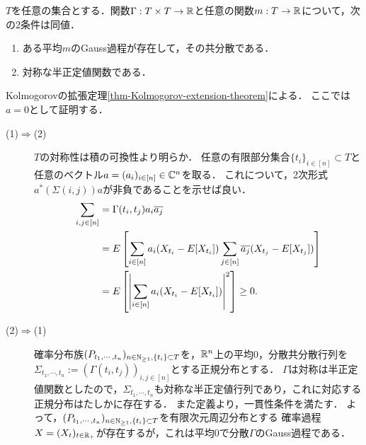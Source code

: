\documentclass[uplatex,dvipdfmx]{jsreport}
\begin{document}
\begin{proposition}[Gauss過程の共分散の特徴付け]\label{prop-existence-of-Gaussian-process}
    $T$を任意の集合とする．関数$\Gamma:T\times T\to\mathbb{R}$と任意の関数$m:T\to\mathbb{R}$について，次の2条件は同値．
    \begin{enumerate}
        \item ある平均$m$のGauss過程が存在して，その共分散である．
        \item 対称な半正定値関数である．
    \end{enumerate}
\end{proposition}
\begin{Proof}
    Kolmogorovの拡張定理\ref{thm-Kolmogorov-extension-theorem}による．
    ここでは$a=0$として証明する．
    \begin{description}
        \item[(1)$\Rightarrow$(2)] $T$の対称性は積の可換性より明らか．
        任意の有限部分集合$\{t_i\}_{i\in[n]}\subset T$と任意のベクトル$a=(a_i)_{i\in[n]}\in\mathbb{C}^n$を取る．
        これについて，2次形式$a^*(\Sigma(i,j))a$が非負であることを示せば良い．
        \begin{align*}
            \sum_{i,j\in[n]}&=\Gamma(t_i,t_j)a_i\overline{a_j}\\
            &=E\left[\sum_{i\in[n]}a_i(X_{t_i}-E[X_{t_i}])\sum_{j\in[n]}\overline{a_j}(X_{t_j}-E[X_{t_j}])\right]\\
            &=E\left[\left|\sum_{i\in[n]}a_i(X_{t_i}-E[X_{t_i}])\right|^2\right]\ge0.
        \end{align*}
        \item[(2)$\Rightarrow$(1)] 
        確率分布族$(P_{t_1,\cdots,t_n})_{n\in\mathbb{N}_{\ge1},\{t_i\}\subset T}$を，$\mathbb{R}^n$上の平均$0$，分散共分散行列を$\Sigma_{t_1,\cdots,t_n}:=(\Gamma(t_i,t_j))_{i,j\in[n]}$とする正規分布とする．
        $\Gamma$は対称は半正定値関数としたので，$\Sigma_{t_1,\cdots,t_n}$も対称な半正定値行列であり，これに対応する正規分布はたしかに存在する．
        また定義より，一貫性条件を満たす．
        よって，$(P_{t_1,\cdots,t_n})_{n\in\mathbb{N}_{\ge1},\{t_i\}\subset T}$を有限次元周辺分布とする
        確率過程$X=(X_t)_{t\in\mathbb{R}_+}$が存在するが，これは平均$0$で分散$\Gamma$のGauss過程である．
    \end{description}
\end{Proof}
\end{document}
